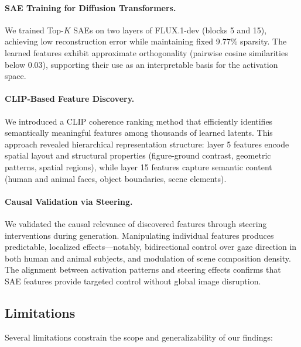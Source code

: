 \documentclass{article}
\begin{document}
\paragraph{SAE Training for Diffusion Transformers.}
We trained Top-$K$ SAEs on two layers of FLUX.1-dev (blocks 5 and 15), achieving low reconstruction error while maintaining fixed 9.77\% sparsity. The learned features exhibit approximate orthogonality (pairwise cosine similarities below 0.03), supporting their use as an interpretable basis for the activation space.

\paragraph{CLIP-Based Feature Discovery.}
We introduced a CLIP coherence ranking method that efficiently identifies semantically meaningful features among thousands of learned latents. This approach revealed hierarchical representation structure: layer 5 features encode spatial layout and structural properties (figure-ground contrast, geometric patterns, spatial regions), while layer 15 features capture semantic content (human and animal faces, object boundaries, scene elements).

\paragraph{Causal Validation via Steering.}
We validated the causal relevance of discovered features through steering interventions during generation. Manipulating individual features produces predictable, localized effects---notably, bidirectional control over gaze direction in both human and animal subjects, and modulation of scene composition density. The alignment between activation patterns and steering effects confirms that SAE features provide targeted control without global image disruption.

\subsection{Limitations}
Several limitations constrain the scope and generalizability of our findings:
\end{document}
